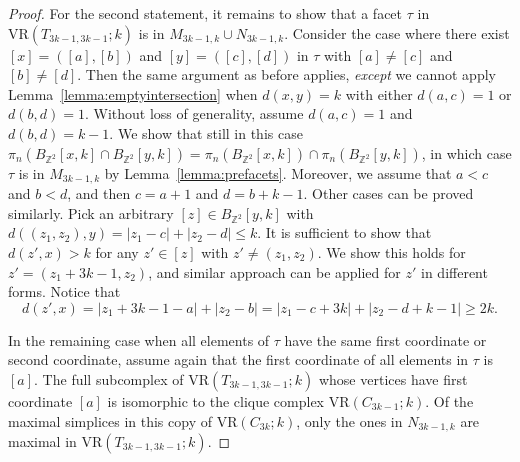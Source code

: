 \documentclass[12pt,a4paper]{amsart}
\theoremstyle{definition}
\newcommand{\Z}{\ensuremath{\mathbb{Z}}}
\newcommand{\vr}[2]{\mathrm{VR}(#1;#2)}
\newcommand{\note}[1]{\textcolor{blue}{({#1})}}
\numberwithin{equation}{section}
\begin{document}
\begin{proof}
For the second statement, it remains to show that a facet $\tau$ in $\vr{T_{3k-1,3k-1}}{k}$ is in $M_{3k-1,k}\cup N_{3k-1,k}$.
Consider the case where there exist $[x] =([a], [b])$ and $[y]=([c], [d])$ in $\tau$ with $[a]\neq [c]$ and $[b]\neq [d]$.
Then the same argument as before applies, \emph{except} we cannot apply Lemma~\ref{lemma:emptyintersection} when $d(x, y)=k$ with either $d(a, c)=1$ or $d(b, d)=1$.
Without loss of generality, assume $d(a, c)=1$ and $d(b, d)=k-1$.
We show that still in this case $\pi_n (B_{\Z^2}[x, k]\cap B_{\Z^2}[y, k]) =\pi_n(B_{\Z^2}[x, k]) \cap \pi_n(B_{\Z^2}[y, k])$, in which case $\tau$ is in $M_{3k-1,k}$ by Lemma~\ref{lemma:prefacets}.
Moreover, we assume that $a<c$ and $b<d$, and then $c=a+1$ and $d=b+k-1$.
Other cases can be proved similarly.
Pick an arbitrary $[z]\in B_{\Z^2}[y, k]$ with $d((z_1, z_2), y)=|z_1-c|+|z_2-d|\leq k$. 
It is sufficient to show that $d(z', x)>k$ for any $z'\in [z]$ with $z'\neq (z_1, z_2)$.
We show this holds for $z'=(z_1+3k-1, z_2)$, and similar approach can be applied for $z'$ in different forms.
Notice that \[d(z', x)=|z_1+3k-1-a|+|z_2-b|=|z_1-c+3k|+|z_2-d+k-1|\geq 2k.\]   

In the remaining case when all elements of $\tau$ have the same first coordinate or second coordinate, assume again that the first coordinate of all elements in $\tau$ is $[a]$.
The full subcomplex of $\vr{T_{3k-1,3k-1}}{k}$ whose vertices have first coordinate $[a]$ is isomorphic to the clique complex $\vr{C_{3k-1}}{k}$.
Of the maximal simplices in this copy of $\vr{C_{3k}}{k}$, only the ones in $N_{3k-1,k}$ are maximal in $\vr{T_{3k-1,3k-1}}{k}$.
\end{proof}
\end{document}
